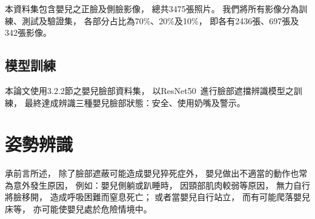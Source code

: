 \documentclass[class=NCU_thesis, crop=false]{standalone}
\begin{document}
本資料集包含嬰兒之正臉及側臉影像，
總共3475張照片。
我們將所有影像分為訓練、測試及驗證集，
各部分占比為70\%、20\%及10\%，
即各有2436張、697張及342張影像。

\subsection{模型訓練}
本論文使用3.2.2節之嬰兒臉部資料集，
以ResNet50~\cite{he_deep_2016}進行臉部遮擋辨識模型之訓練，
最終達成辨識三種嬰兒臉部狀態：安全、使用奶嘴及警示。

\section{姿勢辨識}
承前言所述，
除了臉部遮蔽可能造成嬰兒猝死症外，
嬰兒做出不適當的動作也常為意外發生原因，
例如：嬰兒側躺或趴睡時，
因頸部肌肉較弱等原因，
無力自行將臉移開，
造成呼吸困難而窒息死亡；
或者當嬰兒自行站立，
而有可能爬落嬰兒床等，
亦可能使嬰兒處於危險情境中。
\end{document}
